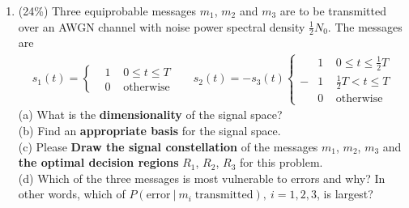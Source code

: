 \documentclass[a4paper,12pt]{article}
\begin{document}
\begin{enumerate}
\begin{align*}
                & \therefore \beta = 0.25
            \end{align*}
            \newpage
            A sketch of the spectrum of the transmitted signal pulse is shown in Figure 2. (The horizontal coordinate, say 3000, is computed as follows:
            $f_c + \frac{1}{2T} = 1800 + 2400 / 2 = 3000$)
            \begin{figure}[h]
            	\centering
            	\texttt{[image: Practice3-7-3.jpg]}
            	\caption{transmitter block diagram}
            \end{figure}
            \begin{flushright}
                $\blacksquare$
            \end{flushright}
        \item (24\%) 
            Three equiprobable messages $m_1$, $m_2$ and $m_3$ are to be transmitted over an AWGN channel with noise power spectral density $\frac{1}{2}N_0$. The messages are 
            \begin{align*}
                s_1(t) = \left\{
                \begin{aligned}
                    & 1 \;\;\;\; 0 \leq t \leq T \\ 
                    & 0 \;\;\;\; \text{otherwise}
                \end{aligned}
                \right.
                \;\;\;\;\;\;
                s_2(t) = -s_3(t) \left\{
                \begin{aligned}
                     &1  \;\;\;\; 0 \leq t \leq \frac{1}{2}T \\ 
                    -&1 \;\;\;\; \frac{1}{2}T < t \leq T \\
                     &0  \;\;\;\; \text{otherwise}
                \end{aligned}
                \right.
            \end{align*}
            (a) What is the \textbf{dimensionality} of the signal space? \\ 
            (b) Find an \textbf{appropriate basis} for the signal space. \\ 
            (c) Please \textbf{Draw the signal constellation} of the messages $m_1$, $m_2$, $m_3$ and \textbf{the optimal decision regions} $R_1$, $R_2$, $R_3$ for this problem. \\ 
            (d) Which of the three messages is most vulnerable to errors and why? In other words, which of $P(\text{error} \ | \ m_i \; \text{transmitted}), \ i = 1, 2, 3$, is largest? \\ \\ 

\end{enumerate}
\end{document}
